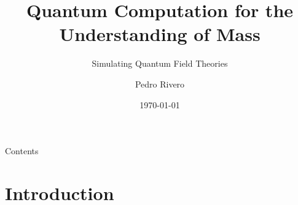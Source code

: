\documentclass[9pt, handout, aspectratio=169]{beamer}	%
\title{Quantum Computation for the Understanding of Mass}
\subtitle{Simulating Quantum Field Theories}
\author{Pedro Rivero}
\institute{Argonne National Laboratory \\ Illinois Institute of Technology}
\date{\today}
\begin{document}
	\justify
	\setlength{\abovedisplayskip}{0pt}
	\setlength{\belowdisplayskip}{12pt}
	\setlength{\abovedisplayshortskip}{0pt}
	\setlength{\belowdisplayshortskip}{12pt}

\begin{frame}[plain,t]
	\titlepage
\end{frame}

\begin{frame}[c]{Contents}
	\tableofcontents
\end{frame}



\section{Introduction}
\end{document}
